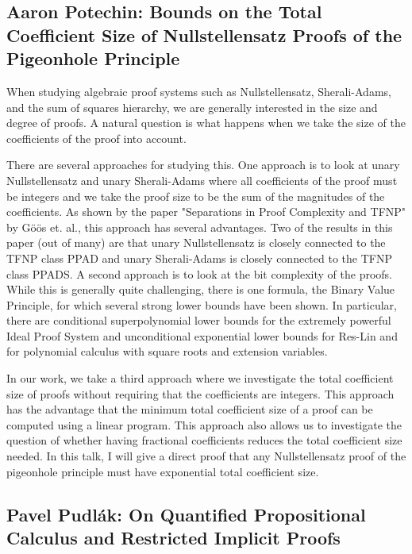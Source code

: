 \documentclass[11pt]{article}
\begin{document}
\subsection*{Aaron Potechin: Bounds on the Total Coefficient Size of Nullstellensatz Proofs of the Pigeonhole Principle}\label{Potechin}

When studying algebraic proof systems such as Nullstellensatz, Sherali-Adams, and the sum of squares hierarchy, we are generally interested in the size and degree of proofs. A natural question is what happens when we take the size of the coefficients of the proof into account. 

There are several approaches for studying this. One approach is to look at unary Nullstellensatz and unary Sherali-Adams where all coefficients of the proof must be integers and we take the proof size to be the sum of the magnitudes of the coefficients. As shown by the paper "Separations in Proof Complexity and TFNP" by Göös et. al., this approach has several advantages. Two of the results in this paper (out of many) are that unary Nullstellensatz is closely connected to the TFNP class PPAD and unary Sherali-Adams is closely connected to the TFNP class PPADS. A second approach is to look at the bit complexity of the proofs. While this is generally quite challenging, there is one formula, the Binary Value Principle, for which several strong lower bounds have been shown. In particular, there are conditional superpolynomial lower bounds for the extremely powerful Ideal Proof System and unconditional exponential lower bounds for Res-Lin and for polynomial calculus with square roots and extension variables.

In our work, we take a third approach where we investigate the total coefficient size of proofs without requiring that the coefficients are integers. This approach has the advantage that the minimum total coefficient size of a proof can be computed using a linear program. This approach also allows us to investigate the question of whether having fractional coefficients reduces the total coefficient size needed. In this talk, I will give a direct proof that any Nullstellensatz proof of the pigeonhole principle must have exponential total coefficient size. 



\subsection*{Pavel Pudl\'{a}k: On Quantified Propositional Calculus and Restricted Implicit Proofs}\label{Pudlak}
\end{document}
